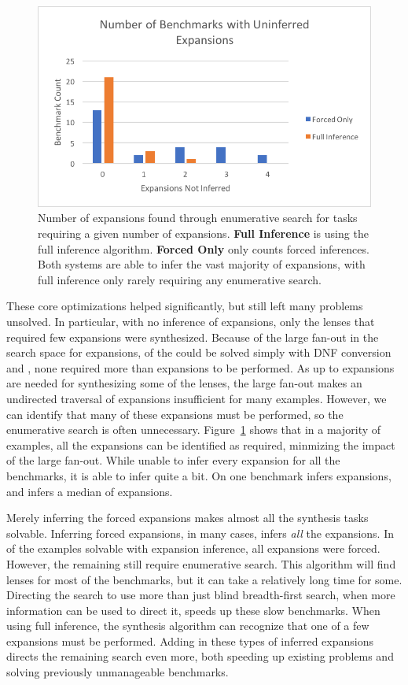 \documentclass[acmsmall]{acmart}
\begin{document}
\begin{figure}
  \includegraphics{UninferredExpansions}
  \caption{Number of expansions found through enumerative search for tasks
    requiring a given number of
    expansions.  {\bf Full Inference} is using the full inference algorithm.
    {\bf Forced Only} only counts forced inferences.  Both systems are able
    to infer the vast majority of expansions, with full inference only rarely
    requiring any enumerative search.}
  \label{fig:uninferred-exps}
\end{figure}

These core optimizations helped significantly, but still left many problems
unsolved.  In particular, with no inference of expansions, only the lenses
that required few expansions were synthesized.  Because of the large fan-out
in the search space for expansions, of the  could be solved simply
with DNF conversion and \RigidSynth{}, none required more than 
expansions to be performed.  As up to  expansions are needed for
synthesizing some of the lenses, the large fan-out makes an undirected
traversal of expansions insufficient for many examples.
However, we can identify that many of these expansions must be performed, so
the enumerative search is often unnecessary.
Figure~\ref{fig:uninferred-exps} shows that in a majority of examples, all the
expansions can be identified as required, minmizing the impact of the
large fan-out.  While unable to infer every expansion for all the benchmarks,
it is able to infer quite a bit.
On one benchmark \ForceExpand{} infers  expansions, and \ForceExpand{}
infers a median of  expansions.

Merely inferring the forced expansions makes almost all the synthesis tasks
solvable.  Inferring forced expansions, in many cases, infers
\emph{all} the expansions.  In  of the  examples solvable with
expansion inference, all expansions
were forced.  However, the remaining  still require enumerative search.
This algorithm will find lenses for most of the benchmarks, but it can take a
relatively long time for some.
Directing the search to use more than just blind breadth-first search, when more
information can be used to direct it, speeds up these slow benchmarks.  When
using full inference, the synthesis algorithm can recognize that one of a few
expansions must be performed.  Adding in these types of
inferred expansions directs the remaining search even more, both speeding up
existing problems and solving previously unmanageable benchmarks.
\end{document}
